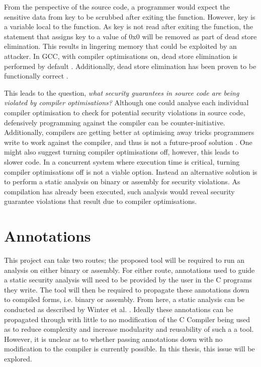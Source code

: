 From the perspective of the source code, a programmer would expect the sensitive data from key to be scrubbed after exiting the function. However, key is a variable local to the function. As key is not read after exiting the function, the statement that assigns key to a value of 0x0 will be removed as part of dead store elimination. This results in lingering memory that could be exploited by an attacker. In GCC, with compiler optimisations on, dead store elimination is performed by default \cite{gccoptimise}. Additionally, dead store elimination has been proven to be functionally correct \cite{benton2004simple}\cite{leroy2006formal}.


This leads to the question, \textit{what security guarantees in source code are being violated by compiler optimisations?} Although one could analyse each individual compiler optimisation to check for potential security violations in source code, defensively programming against the compiler can be counter-initiative. Additionally, compilers are getting better at optimising away tricks programmers write to work against the compiler, and thus is not a future-proof solution \cite{simon2018you}. One might also suggest turning compiler optimisations off, however, this leads to slower code. In a concurrent system where execution time is critical, turning compiler optimisations off is not a viable option. Instead an alternative solution is to perform a static analysis on binary or assembly for security violations. As compilation has already been executed, such analysis would reveal security guarantee violations that result due to compiler optimisations.

\section{Annotations}
This project can take two routes; the proposed tool will be required to run an analysis on either binary or assembly. For either route, annotations used to guide a static security analysis will need to be provided by the user in the C programs they write. The tool will then be required to propagate these annotations down to compiled forms, i.e. binary or assembly. From here, a static analysis can be conducted as described by Winter et al. \cite{winter2020information}. Ideally these annotations can be propagated through with little to no modification of the C Compiler being used as to reduce complexity and increase modularity and reusability of such a a tool. However, it is unclear as to whether passing annotations down with no modification to the compiler is currently possible. In this thesis, this issue will be explored.

